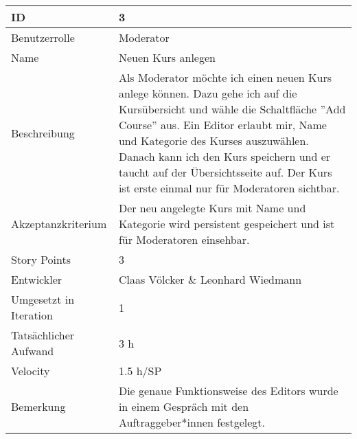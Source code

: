 \begin{tabularx}{\textwidth}{|p{}|X|}
	\hline
	ID & 3\\
	\hline
	Benutzerrolle & Moderator\\
	\hline
	Name & Neuen Kurs anlegen\\
	\hline
	Beschreibung & Als Moderator möchte ich einen neuen Kurs anlege können. Dazu gehe ich auf die Kursübersicht und wähle die Schaltfläche ''Add Course'' aus. Ein Editor erlaubt mir, Name und Kategorie des Kurses auszuwählen. Danach kann ich den Kurs speichern und er taucht auf der Übersichtsseite auf. Der Kurs ist erste einmal nur für Moderatoren sichtbar.
\\
	\hline
	Akzeptanzkriterium & Der neu angelegte Kurs mit Name und Kategorie wird persistent gespeichert und ist für Moderatoren einsehbar.\\
	\hline
	Story Points & 3\\
	\hline
	Entwickler & Claas Völcker \& Leonhard Wiedmann\\
	\hline
	Umgesetzt in Iteration & 1\\
	\hline
	Tatsächlicher Aufwand & 3 h\\
	\hline
	Velocity & 1.5 h/SP\\
	\hline
	Bemerkung & Die genaue Funktionsweise des Editors wurde in einem Gespräch mit den Auftraggeber*innen festgelegt.\\
	\hline
\end{tabularx}
\vspace{20pt}
